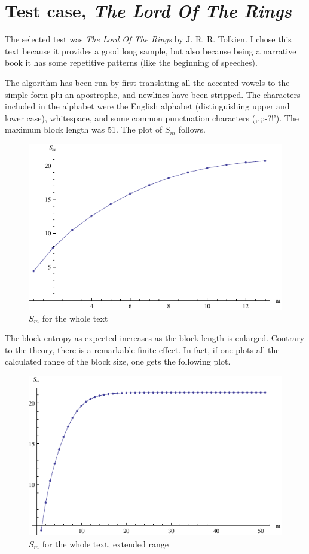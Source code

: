 \documentclass[conference]{IEEEtran}
\begin{document}
\section{Test case, \emph{The Lord Of The Rings}}

The selected test was \emph{The Lord Of The Rings} by J. R. R. Tolkien. I chose this text because it provides a good long sample, but also because being a narrative book it has some repetitive patterns (like the beginning of speeches).

The algorithm has been run by first translating all the accented vowels to the simple form plu an apostrophe, and newlines have been stripped. The characters included in the alphabet were the English alphabet (distinguishing upper and lower case), whitespace, and some common punctuation characters (,.;:-?!'). The maximum block length was 51. The plot of $S_m$ follows.

\begin{figure}[h]
\centering
\includegraphics{Sm.pdf}
\caption{$S_m$ for the whole text}
\end{figure}

The block entropy as expected increases as the block length is enlarged. Contrary to the theory, there is a remarkable finite effect. In fact, if one plots all the calculated range of the block size, one gets the following plot.

\begin{figure}[h]
\centering
\includegraphics{Sm-extend.pdf}
\caption{$S_m$ for the whole text, extended range}
\end{figure}
\end{document}
